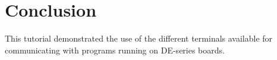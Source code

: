 \documentclass[11pt, twoside, pdftex]{article}
\newcommand{\commonPath}{../../Common}
\begin{document}



\section{Conclusion}

This tutorial demonstrated the use of the different terminals available for communicating with programs running on DE-series boards. 



\end{document}
